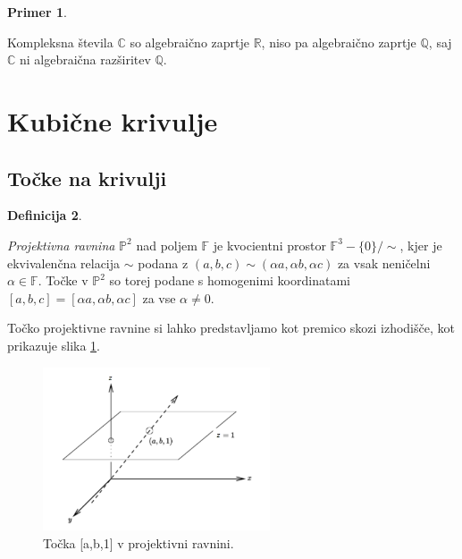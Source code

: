 \documentclass[12pt,a4paper,twoside]{article}
\theoremstyle{definition} %
\newtheorem{definicija}{Definicija}[section]
\newtheorem{primer}[definicija]{Primer}
\theoremstyle{plain} %
\numberwithin{equation}{section}  %
\newcommand{\R}{\mathbb R}
\renewcommand{\C}{\mathbb C}
\newcommand{\Q}{\mathbb Q}
\newcommand{\F}{\mathbb F}
\begin{document}
\begin{primer}~

Kompleksna števila $\C$ so algebraično zaprtje $\R$, niso pa algebraično zaprtje $\Q$, saj $\C$ ni algebraična razširitev $\Q$.

\end{primer}

\newpage

\section{Kubične krivulje}

\subsection{Točke na krivulji}

\begin{definicija}~

\emph{Projektivna ravnina} $\mathbb{P}^2$ nad poljem $\F$ je kvocientni prostor $\F^3-\{0\}/\! \!\sim$, kjer je ekvivalenčna relacija $\sim$ podana z $(a,b,c)\sim(\alpha a,\alpha b,\alpha c)$ za vsak  neničelni $\alpha \in \F$. Točke v $\mathbb{P}^2$ so torej podane s homogenimi koordinatami $[a,b,c] = [\alpha a,\alpha b,\alpha c]$ za vse $\alpha \neq 0$.
\end{definicija} 

Točko projektivne ravnine si lahko predstavljamo kot premico skozi izhodišče, kot prikazuje slika \ref{fig:ravnina}.


\begin{figure}[h]
  \centering
  \includegraphics[width=0.6\textwidth]{images/ravnina.png}
  \caption[Primer točke v projektivni ravnini.]{Točka [a,b,1] v projektivni ravnini.}
  \label{fig:ravnina}
\end{figure}
\end{document}
